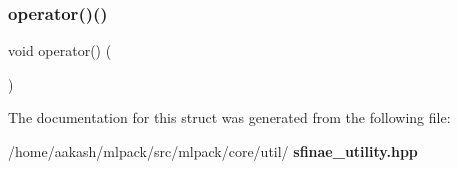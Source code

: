 \subsubsection{operator()()}
{\footnotesize\ttfamily void operator() (\begin{DoxyParamCaption}\item[{Method\+Form$<$ Class, T1, T2, T3, T4, T5, T6, T7 $>$}]{ }\end{DoxyParamCaption})}



The documentation for this struct was generated from the following file\+:\begin{DoxyCompactItemize}
\item 
/home/aakash/mlpack/src/mlpack/core/util/\textbf{ sfinae\+\_\+utility.\+hpp}\end{DoxyCompactItemize}
